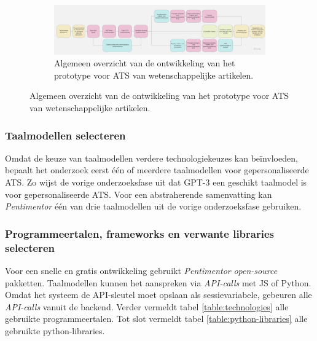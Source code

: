 \begin{figure}
	\begin{figure}[H]
		\includegraphics[width=\linewidth]{img/flowchart-general-development.jpg}
		\caption{Algemeen overzicht van de ontwikkeling van het prototype voor ATS van wetenschappelijke artikelen.}
		\label{img:general-overview-prototype}
	\end{figure}
\end{figure}

\subsubsection{Taalmodellen selecteren}

Omdat de keuze van taalmodellen verdere technologiekeuzes kan beïnvloeden, bepaalt het onderzoek eerst één of meerdere taalmodellen voor gepersonaliseerde ATS. Zo wijst de vorige onderzoeksfase uit dat GPT-3 een geschikt taalmodel is voor gepersonaliseerde ATS. Voor een abstraherende samenvatting kan \textit{Pentimentor} één van drie taalmodellen uit de vorige onderzoeksfase gebruiken.

\subsubsection{Programmeertalen, frameworks en verwante libraries selecteren}

Voor een snelle en gratis ontwikkeling gebruikt \textit{Pentimentor} \textit{open-source} pakketten. Taalmodellen kunnen het aanspreken via \textit{API-calls} met JS of Python. Omdat het systeem de API-sleutel moet opslaan als sessievariabele, gebeuren alle \textit{API-calls} vanuit de backend. Verder vermeldt tabel \ref{table:technologies} alle gebruikte programmeertalen. Tot slot vermeldt tabel \ref{table:python-libraries} alle gebruikte python-libraries.

